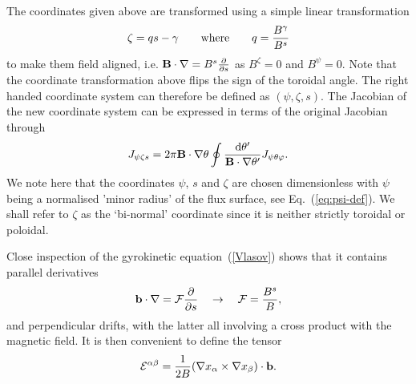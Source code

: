 The coordinates given above are transformed using a simple linear transformation 
\begin{equation} 
\zeta =  q s - \gamma \qquad {\rm where} \qquad q = {B^\gamma \over B^s} 
\end{equation}
to make them field aligned, i.e. ${\bf B} \cdot \nabla = B^s \frac{\partial }{\partial s}$ as $B^\zeta = 0$ and $B^\psi = 0$. 
Note that the coordinate transformation above flips the sign of the toroidal angle. 
The right handed coordinate system can therefore be defined as $(\psi,\zeta,s)$. 
The Jacobian of the new coordinate system can be expressed in terms of the original 
Jacobian through 
\begin{equation} 
J_{\psi  \zeta s} = 2\pi {\bf B} \cdot \nabla \theta \oint {{\rm d} \theta^\prime \over 
{{\bf B} \cdot \nabla \theta^\prime}} J_{\psi \theta \varphi} .
\end{equation} 
We note here that the coordinates $\psi$, $s$ and $\zeta$ are chosen dimensionless with $\psi$ being a normalised 'minor radius' of the flux surface, see Eq.~(\ref{eq:psi-def}).
We shall refer to $\zeta$ as the `bi-normal' coordinate since it is neither strictly toroidal or poloidal.

Close inspection of the gyrokinetic equation~(\ref{Vlasov}) shows that it contains parallel derivatives 
\begin{equation} 
{\bf b} \cdot \nabla  = {{\cal F}} \frac{\partial }{\partial s} \quad \rightarrow \quad 
{\cal F} = {B^s \over B} ,
\end{equation}
and perpendicular drifts, with the latter all involving a cross product with the magnetic field. 
It is then convenient to define the tensor 
\begin{equation} 
\label{efun}
{\cal E}^{\alpha \beta} = {1 \over 2 B} (\nabla x_\alpha \times \nabla x_\beta) \cdot {\bf b}.
\end{equation} 


